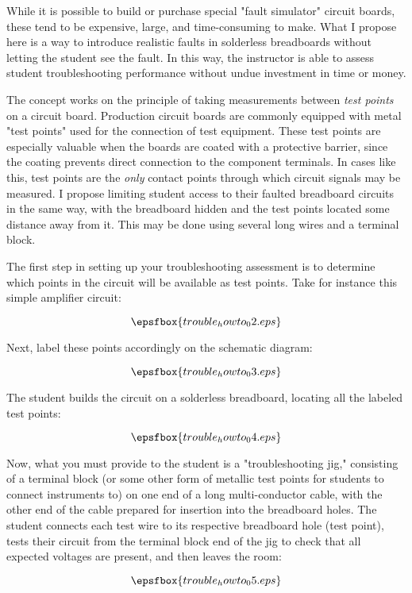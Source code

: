 While it is possible to build or purchase special "fault simulator" circuit boards, these tend to be expensive, large, and time-consuming to make.  What I propose here is a way to introduce realistic faults in solderless breadboards without letting the student see the fault.  In this way, the instructor is able to assess student troubleshooting performance without undue investment in time or money.

The concept works on the principle of taking measurements between {\it test points} on a circuit board.  Production circuit boards are commonly equipped with metal "test points" used for the connection of test equipment.  These test points are especially valuable when the boards are coated with a protective barrier, since the coating prevents direct connection to the component terminals.  In cases like this, test points are the {\it only} contact points through which circuit signals may be measured.  I propose limiting student access to their faulted breadboard circuits in the same way, with the breadboard hidden and the test points located some distance away from it.  This may be done using several long wires and a terminal block.

\goodbreak
The first step in setting up your troubleshooting assessment is to determine which points in the circuit will be available as test points.  Take for instance this simple amplifier circuit:

$$\epsfbox{trouble_howto_02.eps}$$

Next, label these points accordingly on the schematic diagram:

$$\epsfbox{trouble_howto_03.eps}$$

The student builds the circuit on a solderless breadboard, locating all the labeled test points:

$$\epsfbox{trouble_howto_04.eps}$$

Now, what you must provide to the student is a "troubleshooting jig," consisting of a terminal block (or some other form of metallic test points for students to connect instruments to) on one end of a long multi-conductor cable, with the other end of the cable prepared for insertion into the breadboard holes.  The student connects each test wire to its respective breadboard hole (test point), tests their circuit from the terminal block end of the jig to check that all expected voltages are present, and then leaves the room:

$$\epsfbox{trouble_howto_05.eps}$$

